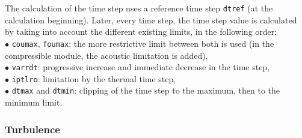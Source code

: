 The calculation of the time step uses a reference time step {\tt dtref} (at
the calculation beginning). Later, every time step, the time step value
is calculated by taking into account the different existing limits, in
the following order: \\
\hspace*{1.cm}$\bullet$ {\tt coumax}, {\tt foumax}: the more restrictive limit between
both is used (in the compressible module, the acoustic limitation is added),\\
\hspace*{1.cm}$\bullet$ {\tt varrdt}:  progressive increase and immediate
decrease in the time step,\\
\hspace*{1.cm}$\bullet$ {\tt iptlro}: limitation by the thermal time step,\\
\hspace*{1.cm}$\bullet$ {\tt dtmax} and {\tt dtmin}: clipping of the time step to
the maximum, then to the minimum limit.\\


\subsubsection{Turbulence}

